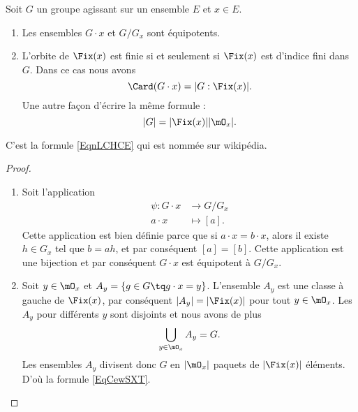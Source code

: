 \begin{proposition}     \label{Propszymlr}
    Soit \( G\) un groupe agissant sur un ensemble \( E\) et \( x\in E\).
    \begin{enumerate}
        \item
            Les ensembles \( G\cdot x\) et \( G/G_x\) sont équipotents.
        \item       \label{ITEMooCWUGooCOFHYk}
            L'orbite de \(\Fix(x)\) est finie si et seulement si \( \Fix(x)\) est d'indice fini dans \( G\). Dans ce cas nous avons
            \begin{equation}        \label{EqnLCHCE}
                \Card(G\cdot x)=| G:\Fix(x) |.
            \end{equation}
            Une autre façon d'écrire la même formule :
            \begin{equation}        \label{EqCewSXT}
                | G |=| \Fix(x) | |\mO_x |.
            \end{equation}
    \end{enumerate}
\end{proposition}
C'est la formule \eqref{EqnLCHCE} qui est nommée  sur wikipédia.

\begin{proof}
    \begin{enumerate}
        \item
    Soit l'application
    \begin{equation}
        \begin{aligned}
            \psi\colon G\cdot x&\to G/G_x \\
            a\cdot x&\mapsto [a].
        \end{aligned}
    \end{equation}
    Cette application est bien définie parce que si \( a\cdot x=b\cdot x\), alors il existe \( h\in G_x\) tel que \( b=ah\), et par conséquent \( [a]=[b]\). Cette application est une bijection et par conséquent \( G\cdot x\) est équipotent à \( G/G_x\).
    \item
        Soit \( y\in \mO_x\) et \( A_y=\{ g\in G\tq g\cdot x=y \}\). L'ensemble \( A_y\) est une classe à gauche de \( \Fix(x)\), par conséquent \( | A_y |=|\Fix(x)|\) pour tout \( y\in\mO_x\). Les \( A_y\) pour différents \( y\) sont disjoints et nous avons de plus
        \begin{equation}
            \bigcup_{y\in\mO_x}A_y=G.
        \end{equation}
        Les ensembles \( A_y\) divisent donc \( G\) en \( | \mO_x |\) paquets de \( | \Fix(x) |\) éléments. D'où la formule \eqref{EqCewSXT}.

    \end{enumerate}
\end{proof}

